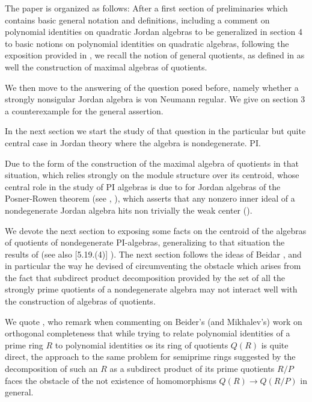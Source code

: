 \documentclass[a4paper,twoside,11pt]{article}
\theoremstyle{plain}
\theoremstyle{miestilo}
\theoremstyle{misnotas}
\begin{document}
 The paper is organized as follows: After a first section of preliminaries which contains basic general notation and definitions, including a comment
 on polynomial identities on quadratic Jordan algebras to be generalized in section 4 to basic notions on polynomial identities on quadratic algebras, following the exposition provided in \cite[3.1.5]{jac-struc}, we recall the notion of general quotients, as defined in \cite{densos} as well the construction of maximal algebras of quotients.

 We then move to the answering of the question posed before, namely whether a strongly nonsigular Jordan algebra is von Neumann regular. We give on section 3 a counterexample for the general assertion.

 In the next section we start the study of that question in the particular but quite central case in Jordan theory where the algebra is nondegenerate. PI.

 Due to the form of the construction of the maximal algebra of quotients in that situation, which relies strongly on the module structure over its centroid, whose central role in the study of PI algebras is due to \cite[3.6]{fgm} for Jordan algebras of the Posner-Rowen theorem (see \cite[6.1.28]{anillos}, \cite[1.7.9]{rowen-pi}), which asserts that any nonzero inner ideal of a nondegenerate Jordan algebra hits non trivially the weak center (\cite{fulgham}).

 We devote the next section to exposing some facts on the centroid of the algebras of quotients of nondegenerate PI-algebras, generalizing to that situation the results of \cite{pi-covers} (see also [5.19.(4)] \cite{densos}). The next section follows the ideas of Beidar \cite{bmi}, and in particular the way he devised of circumventing the obstacle which arises from the fact that subdirect product decomposition provided by the set of all the strongly prime quotients of a nondegenerate algebra may not interact well with the construction of algebras of quotients.

 We quote \cite{lw}, who remark when commenting on Beider's (and Mikhalev's) work on orthogonal completeness that while trying to relate polynomial identities of a prime ring $R$ to polynomial identities os its ring of quotients $Q(R)$ is quite direct, the approach to the same problem for semiprime rings suggested by the decomposition of such an $R$ as a subdirect product of its prime quotients $R/P$ faces the obstacle of the not existence of homomorphisms $Q(R)\rightarrow Q(R/P)$ in general.
\end{document}
